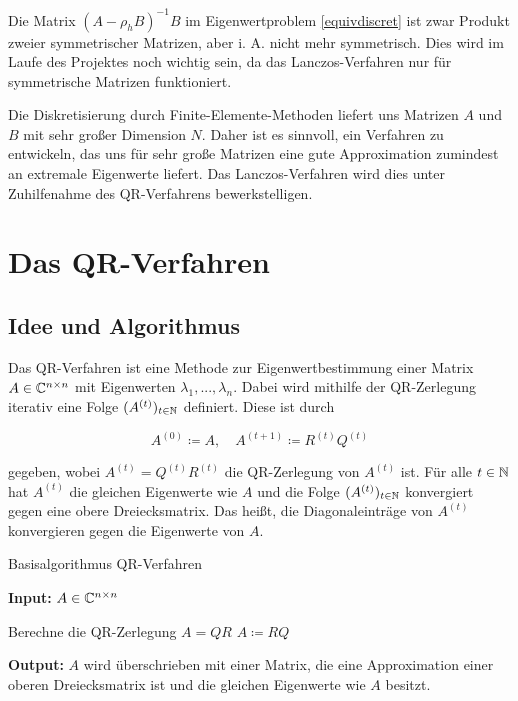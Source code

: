 \documentclass{article}
\begin{document}
\begin{remark}
	Die Matrix $(A - \rho_h B)^{-1} B$ im Eigenwertproblem \ref{equivdiscret} ist zwar Produkt zweier symmetrischer Matrizen, aber i. A. nicht mehr symmetrisch. Dies wird im Laufe des Projektes noch wichtig sein, da das Lanczos-Verfahren nur für symmetrische Matrizen funktioniert.
\end{remark}

Die Diskretisierung durch Finite-Elemente-Methoden liefert uns Matrizen $A$ und $B$ mit sehr großer Dimension $N$. Daher ist es sinnvoll, ein Verfahren zu entwickeln, das uns für sehr große Matrizen eine gute Approximation zumindest an extremale Eigenwerte liefert. Das Lanczos-Verfahren wird dies unter Zuhilfenahme des QR-Verfahrens bewerkstelligen.

\section{Das QR-Verfahren}

\subsection{Idee und Algorithmus}

Das QR-Verfahren ist eine Methode zur Eigenwertbestimmung einer Matrix $A \in \mathbb{C}^{n \times n}$ mit Eigenwerten $\lambda_1, ..., \lambda_n$. Dabei wird mithilfe der QR-Zerlegung iterativ eine Folge $(A^{(t)})_{t \in \mathbb{N}}$ definiert. Diese ist durch

\begin{equation}
	A^{(0)} \coloneqq A, \quad A^{(t+1)} \coloneqq R^{(t)}Q^{(t)}
\end{equation}

gegeben, wobei $A^{(t)} = Q^{(t)} R^{(t)}$ die QR-Zerlegung von $A^{(t)}$ ist.
Für alle $t\in \mathbb{N}$ hat $A^{(t)}$ die gleichen Eigenwerte wie $A$ und die Folge $(A^{(t)})_{t \in \mathbb{N}}$ konvergiert gegen eine obere Dreiecksmatrix. Das heißt, die Diagonaleinträge von $A^{(t)}$ konvergieren gegen die Eigenwerte von $A$.

\renewcommand{\algorithmicrequire}{\textbf{Input:}}
\renewcommand{\algorithmicensure}{\textbf{Output:}}

\begin{algorithm}

	\caption{Basisalgorithmus QR-Verfahren}
	\label{QR-Verfahren}
	\algorithmicrequire{ $A \in \mathbb{C}^{n\times n}$}
	\begin{algorithmic}[1]
		\State Berechne die QR-Zerlegung $A = QR$
		\State $A \coloneqq RQ$
		\EndWhile
	\end{algorithmic}
	\algorithmicensure{ $A$ wird überschrieben mit einer Matrix, die eine Approximation einer oberen Dreiecksmatrix ist und die gleichen Eigenwerte wie $A$ besitzt.}
\end{algorithm}
\end{document}
